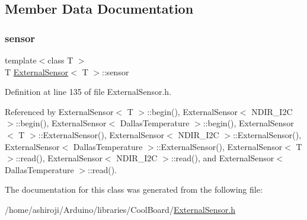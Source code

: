 \subsection{Member Data Documentation}
\mbox{\label{classExternalSensor_a6e1f518119abe08c14b498ce24a7e1b3}} 
\subsubsection{\texorpdfstring{sensor}{sensor}}
{\footnotesize\ttfamily template$<$class T $>$ \\
T \hyperlink{classExternalSensor}{External\+Sensor}$<$ T $>$\+::sensor\hspace{0.3cm}{\ttfamily [private]}}



Definition at line 135 of file External\+Sensor.\+h.



Referenced by External\+Sensor$<$ T $>$\+::begin(), External\+Sensor$<$ N\+D\+I\+R\+\_\+\+I2\+C $>$\+::begin(), External\+Sensor$<$ Dallas\+Temperature $>$\+::begin(), External\+Sensor$<$ T $>$\+::\+External\+Sensor(), External\+Sensor$<$ N\+D\+I\+R\+\_\+\+I2\+C $>$\+::\+External\+Sensor(), External\+Sensor$<$ Dallas\+Temperature $>$\+::\+External\+Sensor(), External\+Sensor$<$ T $>$\+::read(), External\+Sensor$<$ N\+D\+I\+R\+\_\+\+I2\+C $>$\+::read(), and External\+Sensor$<$ Dallas\+Temperature $>$\+::read().



The documentation for this class was generated from the following file\+:\begin{DoxyCompactItemize}
\item 
/home/ashiroji/\+Arduino/libraries/\+Cool\+Board/\hyperlink{ExternalSensor_8h}{External\+Sensor.\+h}\end{DoxyCompactItemize}
